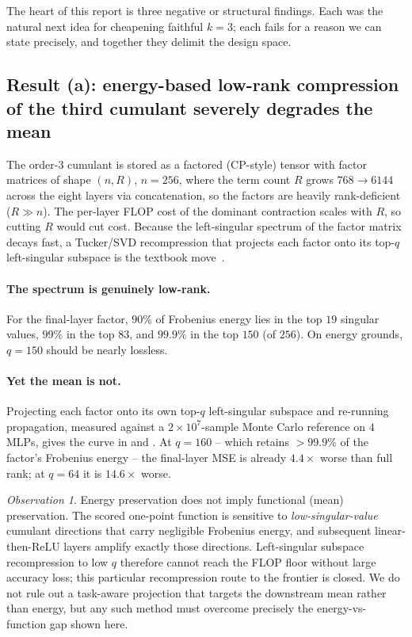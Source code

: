 \documentclass[11pt]{article}
\theoremstyle{remark}
\newtheorem{observation}{Observation}
\begin{document}
The heart of this report is three negative or structural findings. Each was the
natural next idea for cheapening faithful $k{=}3$; each fails for a reason we can
state precisely, and together they delimit the design space.

\subsection{Result (a): energy-based low-rank compression of the third cumulant
severely degrades the mean}
\label{sec:resa}

The order-3 cumulant is stored as a factored (CP-style) tensor with factor
matrices of shape $(n, R)$, $n=256$, where the term count $R$ grows
$768\to6144$ across the eight layers via concatenation, so the factors are
heavily rank-deficient ($R\gg n$). The per-layer FLOP cost of the dominant
contraction scales with $R$, so cutting $R$ would cut cost. Because the
left-singular spectrum of the factor matrix decays fast, a Tucker/SVD
recompression that projects each factor onto its top-$q$ left-singular subspace
is the textbook move~\cite{kolda2009tensor, comon2008symmetric}.

\paragraph{The spectrum is genuinely low-rank.}
For the final-layer factor, $90\%$ of Frobenius energy lies in the top $19$
singular values, $99\%$ in the top $83$, and $99.9\%$ in the top $150$ (of
$256$). On energy grounds, $q=150$ should be nearly lossless.

\paragraph{Yet the mean is not.}
Projecting each factor onto its own top-$q$ left-singular subspace and
re-running propagation, measured against a $2\times10^7$-sample Monte Carlo
reference on $4$ MLPs, gives the curve in  and
. At $q=160$ -- which retains $>99.9\%$ of the factor's
Frobenius energy -- the final-layer MSE is already $4.4\times$ worse than full
rank; at $q=64$ it is $14.6\times$ worse.

\begin{observation}
Energy preservation does not imply functional (mean) preservation. The scored
one-point function is sensitive to \emph{low-singular-value} cumulant directions
that carry negligible Frobenius energy, and subsequent linear-then-ReLU layers
amplify exactly those directions. Left-singular subspace recompression to low
$q$ therefore cannot reach the FLOP floor without large accuracy loss; this
particular recompression route to the frontier is closed. We do not rule out a
task-aware projection that targets the downstream mean rather than energy, but
any such method must overcome precisely the energy-vs-function gap shown here.
\end{observation}
\end{document}
